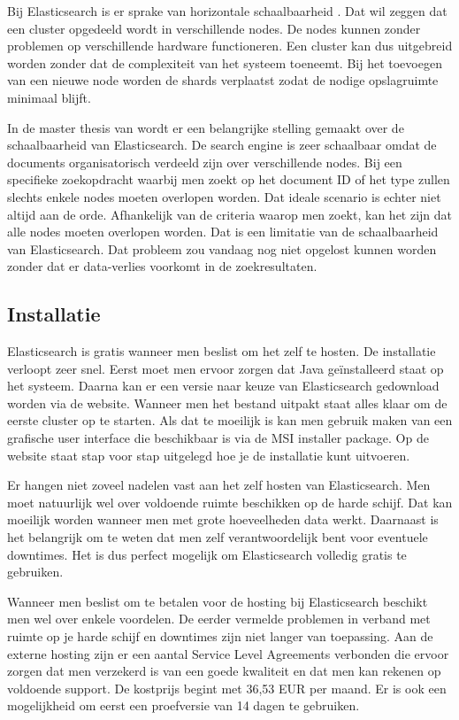 Bij Elasticsearch is er sprake van horizontale schaalbaarheid \autocite{Dixit2016}. Dat wil zeggen dat een cluster opgedeeld wordt in verschillende nodes. De nodes kunnen zonder problemen op verschillende hardware functioneren. Een cluster kan dus uitgebreid worden zonder dat de complexiteit van het systeem toeneemt. Bij het toevoegen van een nieuwe node worden de shards verplaatst zodat de nodige opslagruimte minimaal blijft.

In de master thesis van \textcite{Berglund2013} wordt er een belangrijke stelling gemaakt over de schaalbaarheid van Elasticsearch. De search engine is zeer schaalbaar omdat de documents organisatorisch verdeeld zijn over verschillende nodes. Bij een specifieke zoekopdracht waarbij men zoekt op het document ID of het type zullen slechts enkele nodes moeten overlopen worden. Dat ideale scenario is echter niet altijd aan de orde. Afhankelijk van de criteria waarop men zoekt, kan het zijn dat alle nodes moeten overlopen worden. Dat is een limitatie van de schaalbaarheid van Elasticsearch. Dat probleem zou vandaag nog niet opgelost kunnen worden zonder dat er data-verlies voorkomt in de zoekresultaten. 

\subsection{Installatie}
\label{Installatie}

Elasticsearch is gratis wanneer men beslist om het zelf te hosten. De installatie verloopt zeer snel. Eerst moet men ervoor zorgen dat Java geïnstalleerd staat op het systeem. Daarna kan er een versie naar keuze van Elasticsearch gedownload worden via de website. Wanneer men het bestand uitpakt staat alles klaar om de eerste cluster op te starten. Als dat te moeilijk is kan men gebruik maken van een grafische user interface die beschikbaar is via de MSI installer package. Op de website staat stap voor stap uitgelegd hoe je de installatie kunt uitvoeren. 

Er hangen niet zoveel nadelen vast aan het zelf hosten van Elasticsearch. Men moet natuurlijk wel over voldoende ruimte beschikken op de harde schijf. Dat kan moeilijk worden wanneer men met grote hoeveelheden data werkt. Daarnaast is het belangrijk om te weten dat men zelf verantwoordelijk bent voor eventuele downtimes. Het is dus perfect mogelijk om Elasticsearch volledig gratis te gebruiken. 

Wanneer men beslist om te betalen voor de hosting bij Elasticsearch beschikt men wel over enkele voordelen. De eerder vermelde problemen in verband met ruimte op je harde schijf en downtimes zijn niet langer van toepassing. Aan de externe hosting zijn er een aantal Service Level Agreements verbonden die ervoor zorgen dat men verzekerd is van een goede kwaliteit en dat men kan rekenen op voldoende support. De kostprijs begint met 36,53 EUR per maand. Er is ook een mogelijkheid om eerst een proefversie van 14 dagen te gebruiken.

